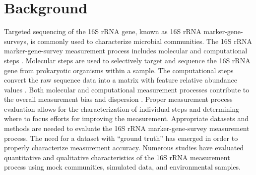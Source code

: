 \documentclass{bmcart}
\begin{document}
\begin{frontmatter}
\begin{abstractbox}
\begin{keyword}
\end{keyword}


\end{abstractbox}
%

\end{frontmatter}



\section*{Background}

Targeted sequencing of the 16S rRNA gene, known as 16S rRNA
marker-gene-surveys, is commonly used to characterize
microbial communities. The 16S rRNA marker-gene-survey
measurement process includes molecular and
computational steps \cite{Goodrich2014}.
Molecular steps are used to selectively target and sequence the 16S rRNA
gene from prokaryotic organisms within a sample. The computational steps
convert the raw sequence data into a matrix with feature relative abundance values
\cite{Goodrich2014}. Both molecular and computational measurement
processes contribute to the overall measurement bias and dispersion
\cite{Amore2016, Goodrich2014, brooks2015truth}. Proper measurement
process evaluation allows for the characterization of individual
steps and determining where to focus efforts for improving the measurement. Appropriate
datasets and methods are needed to evaluate the 16S rRNA
marker-gene-survey measurement process. The need for a  dataset with
``ground truth'' has emerged in order to properly characterize measurement accuracy.
Numerous studies have evaluated quantitative and qualitative
characteristics of the 16S rRNA measurement process using mock
communities, simulated data, and environmental samples.
\end{document}
